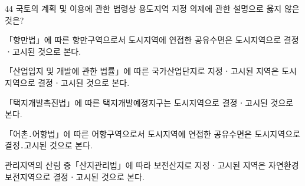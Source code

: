 \begin{question}{44}
국토의 계획 및 이용에 관한 법령상 용도지역 지정 의제에 관한 설명으로 옳지 않은 것은?
\begin{choices}
  \item 「항만법」에 따른 항만구역으로서 도시지역에 연접한 공유수면은 도시지역으로 결정ㆍ고시된 것으로 본다.
  \item 「산업입지 및 개발에 관한 법률」에 따른 국가산업단지로 지정ㆍ고시된 지역은 도시지역으로 결정ㆍ고시된 것으로 본다.
  \item 「택지개발촉진법」에 따른 택지개발예정지구는 도시지역으로 결정ㆍ고시된 것으로 본다.
  \item 「어촌․어항법」에 따른 어항구역으로서 도시지역에 연접한 공유수면은 도시지역으로 결정․고시된 것으로 본다.
  \item 관리지역의 산림 중「산지관리법」에 따라 보전산지로 지정ㆍ고시된 지역은 자연환경보전지역으로 결정ㆍ고시된 것으로 본다.
\end{choices}
\end{question}
